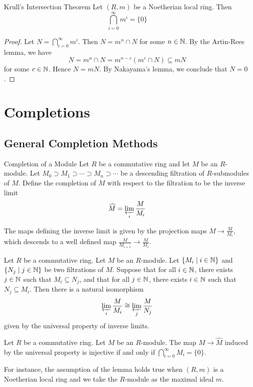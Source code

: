 \documentclass[a4paper]{article}
\begin{document}
\begin{thm}{Krull's Intersection Theorem}{} Let $(R,m)$ be a Noetherian local ring. Then $$\bigcap_{i=0}^\infty m^i=\{0\}$$ 
\begin{proof}
Let $N=\bigcap_{i=0}^\infty m^i$. Then $N=m^n\cap N$ for some $n\in\mathbb{N}$. By the Artin-Rees lemma, we have $$N=m^n\cap N=m^{n-c}(m^c\cap N)\subseteq mN$$ for some $c\in\mathbb{N}$. Hence $N=mN$. By Nakayama's lemma, we conclude that $N=0$. 
\end{proof}
\end{thm}

\pagebreak
\section{Completions}
\subsection{General Completion Methods}
\begin{defn}{Completion of a Module}{} Let $R$ be a commutative ring and let $M$ be an $R$-module. Let $M_0\supset M_1\supset\cdots\supset M_n\supset\cdots$ be a descending filtration of $R$-submodules of $M$. Define the completion of $M$ with respect to the filtration to be the inverse limit $$\widehat{M}=\varprojlim_i\frac{M}{M_i}$$
\end{defn}

The maps defining the inverse limit is given by the projection maps $M\to\frac{M}{M_i}$, which descends to a well defined map $\frac{M}{M_{i+1}}\to\frac{M}{M_i}$. 

\begin{lmm}{}{} Let $R$ be a commutative ring. Let $M$ be an $R$-module. Let $\{M_i\;|\;i\in\mathbb{N}\}$ and $\{N_j\;|\;j\in\mathbb{N}\}$ be two filtrations of $M$. Suppose that for all $i\in\mathbb{N}$, there exists $j\in\mathbb{N}$ such that $M_i\subseteq N_j$, and that for all $j\in\mathbb{N}$, there exists $i\in\mathbb{N}$ such that $N_j\subseteq M_i$. Then there is a natural isomorphism $$\varprojlim_i\frac{M}{M_i}\cong\varprojlim_j\frac{M}{N_j}$$ given by the universal property of inverse limits. 
\end{lmm}

\begin{lmm}{}{} Let $R$ be a commutative ring. Let $M$ be an $R$-module. The map $M\to\widehat{M}$ induced by the universal property is injective if and only if $\bigcap_{i=0}^\infty M_i=\{0\}$. 
\end{lmm}

For instance, the assumption of the lemma holds true when $(R,m)$ is a Noetherian local ring and we take the $R$-module as the maximal ideal $m$. 
\end{document}
